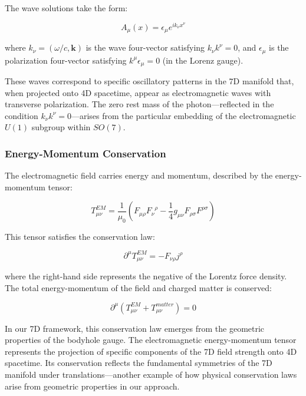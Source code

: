 \documentclass{article}
\begin{document}
The wave solutions take the form:

\begin{equation}
A_{\mu}(x) = \epsilon_{\mu} e^{ik_{\nu}x^{\nu}}
\end{equation}

where $k_{\nu} = (\omega/c, \mathbf{k})$ is the wave four-vector satisfying $k_{\nu}k^{\nu} = 0$, and $\epsilon_{\mu}$ is the polarization four-vector satisfying $k^{\mu}\epsilon_{\mu} = 0$ (in the Lorenz gauge).

These waves correspond to specific oscillatory patterns in the 7D manifold that, when projected onto 4D spacetime, appear as electromagnetic waves with transverse polarization. The zero rest mass of the photon—reflected in the condition $k_{\nu}k^{\nu} = 0$—arises from the particular embedding of the electromagnetic $U(1)$ subgroup within $SO(7)$.

\subsubsection{Energy-Momentum Conservation}

The electromagnetic field carries energy and momentum, described by the energy-momentum tensor:

\begin{equation}
T^{EM}_{\mu\nu} = \frac{1}{\mu_0}(F_{\mu\rho}F_{\nu}^{\;\;\rho} - \frac{1}{4}g_{\mu\nu}F_{\rho\sigma}F^{\rho\sigma})
\end{equation}

This tensor satisfies the conservation law:

\begin{equation}
\partial^{\mu}T^{EM}_{\mu\nu} = -F_{\nu\rho}j^{\rho}
\end{equation}

where the right-hand side represents the negative of the Lorentz force density. The total energy-momentum of the field and charged matter is conserved:

\begin{equation}
\partial^{\mu}(T^{EM}_{\mu\nu} + T^{matter}_{\mu\nu}) = 0
\end{equation}

In our 7D framework, this conservation law emerges from the geometric properties of the bodyhole gauge. The electromagnetic energy-momentum tensor represents the projection of specific components of the 7D field strength onto 4D spacetime. Its conservation reflects the fundamental symmetries of the 7D manifold under translations—another example of how physical conservation laws arise from geometric properties in our approach.
\end{document}

